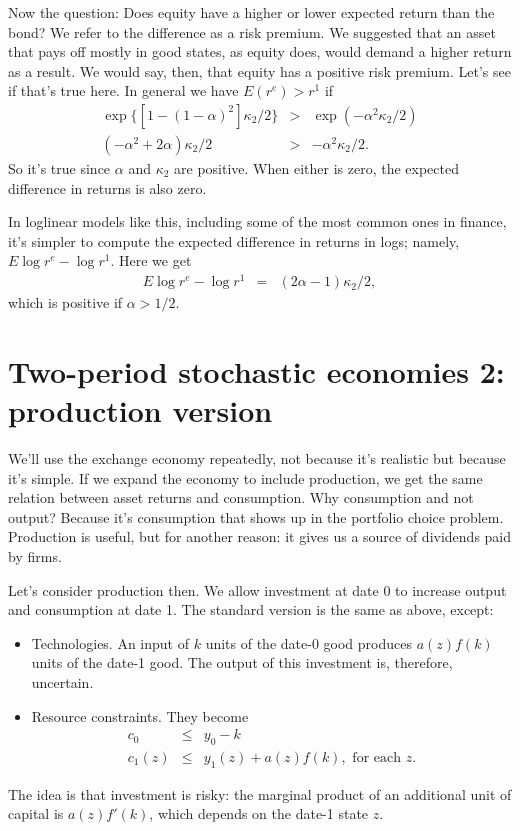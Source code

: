 \documentclass[11pt]{article}
\begin{document}
Now the question:  Does equity have a higher or lower expected return than the bond?
We refer to the difference as a risk premium.
We suggested that an asset that pays off mostly in good states,
as equity does, would demand a higher return as a result.
We would say, then, that equity has a positive risk premium.
Let's see if that's true here.
In general we have $E(r^e) > r^1$ if
\begin{eqnarray*}
    \exp\{ [1 - (1-\alpha)^2] \kappa_2/2 \}
            &>& \exp(-\alpha^2 \kappa_2/2) \\
     (-\alpha^2 + 2 \alpha) \kappa_2/2 &>& -\alpha^2 \kappa_2/2  .
\end{eqnarray*}
So it's true since $\alpha$ and $\kappa_2$ are positive.
When either is zero, the expected difference in returns
is also zero.


In loglinear models like this,
including some of the most common ones in finance,
it's simpler to compute the expected difference in returns in logs;
namely, $ E \log r^e - \log r^1 $.
Here we get
\begin{eqnarray*}
    E  \log r^e - \log r^1  &=& (2 \alpha - 1) \kappa_2 /2 ,
\end{eqnarray*}
which is positive if $\alpha > 1/2$.


\section{Two-period stochastic economies 2:  production version}

We'll use the exchange economy repeatedly, not because it's realistic
but because it's simple.
If we expand the economy to include production, we get the same relation
between asset returns and consumption.
Why consumption and not output?  Because it's consumption that shows
up in the portfolio choice problem.
Production is useful, but for another reason:  it gives us a source
of dividends paid by firms.

Let's consider production then.
We allow investment at date 0 to increase output and consumption
at date 1.
The standard version
is the same as above, except:
\begin{itemize}
\item Technologies.  An input of $k$ units of the date-0 good
produces $ a(z) f(k)$ units of the date-1 good.
The output of this investment is, therefore, uncertain.
\item Resource constraints.  They become
\begin{eqnarray*}
    c_0 &\leq& y_0 - k \\
    c_1(z) &\leq& y_1(z) + a(z) f(k), \mbox{ for each } z .
\end{eqnarray*}
\end{itemize}
The idea is that investment is risky:  the marginal product
of an additional unit of capital is $a(z) f'(k)$,
which depends on the date-1 state $z$.
\end{document}
